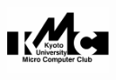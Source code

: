 \documentclass[a4paper,14pt]{jsarticle}
\begin{document}
\hspace{15pt}

\begin{center}
  \includegraphics[bb=0 0 2413 1551,width=3cm]{KMC.bmp}
\end{center}
\end{document}
